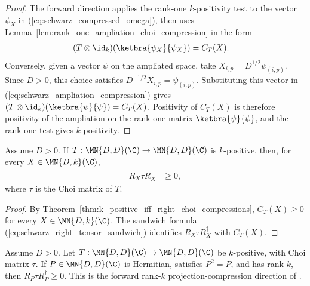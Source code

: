 \begin{proof}
    \leanok
    The forward direction applies the rank-one $k$-positivity test to the
    vector $\psi_X$ in (\ref{eq:schwarz_compressed_omega}), then uses
    Lemma~\ref{lem:rank_one_ampliation_choi_compression} in the form
    \begin{align}
        (T\otimes\id_k)(\ketbra{\psi_X}{\psi_X})
         & =C_T(X).
        \label{eq:schwarz_ampliation_compression}
    \end{align}
    Conversely, given a vector $\psi$ on the ampliated space, take
    $X_{i,p}=D^{1/2}\psi_{(i,p)}$. Since $D>0$, this choice satisfies
    $D^{-1/2}X_{i,p}=\psi_{(i,p)}$. Substituting this vector in
    (\ref{eq:schwarz_ampliation_compression}) gives
    $(T\otimes\id_k)(\ketbra{\psi}{\psi})=C_T(X)$.
    Positivity of $C_T(X)$ is therefore positivity of the ampliation on the
    rank-one matrix $\ketbra{\psi}{\psi}$, and the rank-one test gives
    $k$-positivity.
\end{proof}

\begin{theorem}
    \label{thm:k_positive_right_tensor_choi_sandwiches}
    \leanok
    Assume $D>0$. If
    $T:\MN{D,D}(\C)\to\MN{D,D}(\C)$ is $k$-positive, then, for every
    $X\in\MN{D,k}(\C)$,
    \begin{align}
        R_X\tau R_X^\dagger
         & \ge0,
        \label{eq:schwarz_k_positive_choi_sandwich}
    \end{align}
    where $\tau$ is the Choi matrix of $T$.
\end{theorem}

\begin{proof}
    \leanok
    By Theorem~\ref{thm:k_positive_iff_right_choi_compressions},
    $C_T(X)\ge0$ for every $X\in\MN{D,k}(\C)$. The sandwich formula
    (\ref{eq:schwarz_right_tensor_sandwich}) identifies
    $R_X\tau R_X^\dagger$ with $C_T(X)$.
\end{proof}
\begin{theorem}
    \label{thm:rank_k_right_projection_choi_sandwich_forward}
    \leanok
    Assume $D>0$. Let $T:\MN{D,D}(\C)\to\MN{D,D}(\C)$ be $k$-positive,
    with Choi matrix $\tau$. If $P\in\MN{D,D}(\C)$ is Hermitian, satisfies
    $P^2=P$, and has rank $k$, then $R_P\tau R_P^\dagger\geq0$.
    This is the forward rank-$k$ projection-compression direction of
    \cite[Chapter~3, Proposition~3.1]{Wolf2012Quantum}.
\end{theorem}

